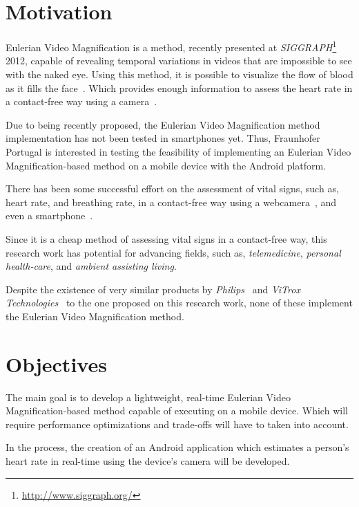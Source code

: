 \documentclass[9pt,a4paper]{extarticle}
\newcommand{\evm}{Eulerian Video Magnification}
\begin{document}
\begin{multicols}{2}

\section{Motivation}\label{sec:motivation}

\evm{} is a method, recently presented at
\emph{SIGGRAPH}\footnote{\url{http://www.siggraph.org/}} 2012, capable of
revealing temporal variations in videos that are impossible to see
with the naked eye. Using this method, it is possible to visualize
the flow of blood as it fills the face~\cite{Wu2012Eulerian}.
Which provides enough information to assess the heart rate in a
contact-free way using a camera~\cite{Wu2012Eulerian,
Poh2010Non, Poh2011Advancements}.

Due to being recently proposed, the \evm{} method implementation
has not been tested in smartphones yet. Thus, Fraunhofer Portugal is
interested in testing the feasibility of implementing an
\evm{}-based method on a mobile device with the Android platform.

There has been some successful effort on the assessment of vital
signs, such as, heart rate, and breathing rate, in a contact-free
way using a webcamera~\cite{Wu2012Eulerian, Poh2010Non, Poh2011Advancements},
and even a smartphone~\cite{Vitrox2013, Philips2013}.

Since it is a cheap method of assessing vital signs in a
contact-free way, this research work has
potential for advancing fields, such as, \emph{telemedicine},
\emph{personal health-care}, and \emph{ambient assisting living}.

Despite the existence of very similar products by
\emph{Philips}~\cite{Philips2013} and
\emph{ViTrox Technologies}~\cite{Vitrox2013}
to the one proposed on this research work, none of these implement
the \evm{} method.

\section{Objectives}\label{sec:objectives}

The main goal is to develop a lightweight, real-time \evm{}-based
method capable of executing on a mobile device. Which will require
performance optimizations and trade-offs will have to taken into account.

In the process, the creation of an Android application which
estimates a person's heart rate in real-time using the device's camera
will be developed.


\end{multicols}
\end{document}
